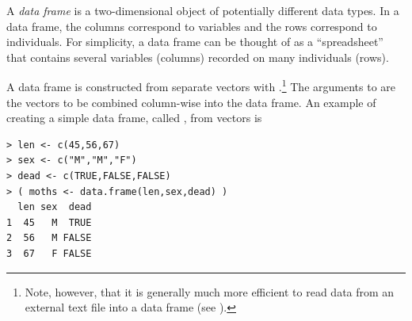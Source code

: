 \documentclass[10pt,openany]{book}\usepackage[]{graphicx}\usepackage[]{color}
\makeatletter
\newenvironment{kframe}{%
 \def\at@end@of@kframe{}%
 \ifinner\ifhmode%
  \def\at@end@of@kframe{\end{minipage}}%
  \begin{minipage}{\columnwidth}%
 \fi\fi%
 \def\FrameCommand##1{\hskip\@totalleftmargin \hskip-\fboxsep
 \colorbox{shadecolor}{##1}\hskip-\fboxsep
     \hskip-\linewidth \hskip-\@totalleftmargin \hskip\columnwidth}%
 \MakeFramed {\advance\hsize-\width
   \@totalleftmargin\z@ \linewidth\hsize
   \@setminipage}}%
 {\par\unskip\endMakeFramed%
 \at@end@of@kframe}
\newenvironment{knitrout}{}{} %
\makeatother
\begin{document}
\vspace{-12pt}

A \emph{data frame} is a two-dimensional object of potentially different data types.  In a data frame, the columns correspond to variables and the rows correspond to individuals.  For simplicity, a data frame can be thought of as a ``spreadsheet'' that contains several variables (columns) recorded on many individuals (rows).


\vspace{-12pt}

\vspace{-12pt}

A data frame is constructed from separate vectors with .\footnote{Note, however, that it is generally much more efficient to read data from an external text file into a data frame (see ).}  The arguments to  are the vectors to be combined column-wise into the data frame.  An example of creating a simple data frame, called , from vectors is
\begin{knitrout}
\color{fgcolor}\begin{kframe}
\begin{verbatim}
> len <- c(45,56,67)
> sex <- c("M","M","F")
> dead <- c(TRUE,FALSE,FALSE)
> ( moths <- data.frame(len,sex,dead) )
  len sex  dead
1  45   M  TRUE
2  56   M FALSE
3  67   F FALSE
\end{verbatim}
\end{kframe}
\end{knitrout}

\end{document}
